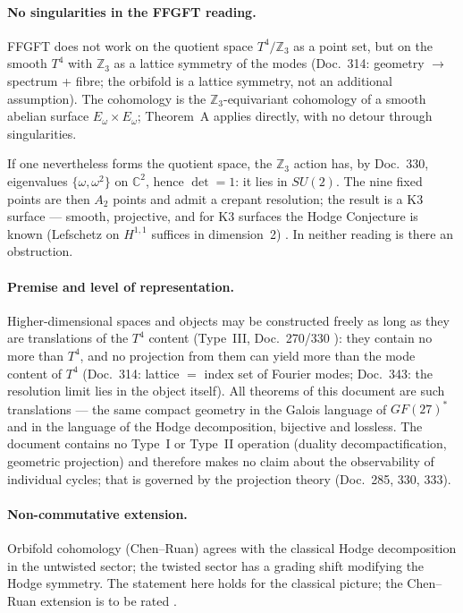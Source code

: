 \paragraph{No singularities in the FFGFT reading.}
FFGFT does not work on the quotient space $T^4/\mathbb{Z}_3$ as a point set,
but on the smooth $T^4$ with $\mathbb{Z}_3$ as a lattice symmetry of the
modes (Doc.~314: geometry $\to$ spectrum + fibre; the orbifold is a lattice
symmetry, not an additional assumption). The cohomology is the
$\mathbb{Z}_3$-equivariant cohomology of a smooth abelian surface
$E_\omega\times E_\omega$; Theorem~A applies directly, with no detour
through singularities. \BM

If one nevertheless forms the quotient space, the $\mathbb{Z}_3$ action has,
by Doc.~330, eigenvalues $\{\omega,\omega^2\}$ on $\mathbb{C}^2$, hence
$\det=1$: it lies in $SU(2)$. The nine fixed points are then $A_2$ points
and admit a crepant resolution; the result is a K3 surface --- smooth,
projective, and for K3 surfaces the Hodge Conjecture is known (Lefschetz on
$H^{1,1}$ suffices in dimension~2) \EM. In neither reading is there an
obstruction.

\paragraph{Premise and level of representation.}
Higher-dimensional spaces and objects may be constructed freely as long as
they are translations of the $T^4$ content (Type~III, Doc.~270/330 \KM):
they contain no more than $T^4$, and no projection from them can yield more
than the mode content of $T^4$ (Doc.~314: lattice $=$ index set of Fourier
modes; Doc.~343: the resolution limit lies in the object itself). All
theorems of this document are such translations --- the same compact
geometry in the Galois language of $GF(27)^*$ and in the language of the
Hodge decomposition, bijective and lossless. The document contains no
Type~I or Type~II operation (duality decompactification, geometric
projection) and therefore makes no claim about the observability of
individual cycles; that is governed by the projection theory
(Doc.~285, 330, 333).

\paragraph{Non-commutative extension.}
Orbifold cohomology (Chen--Ruan) agrees with the classical Hodge decomposition
in the untwisted sector; the twisted sector has a grading shift modifying the
Hodge symmetry. The statement here holds for the classical picture; the
Chen--Ruan extension is to be rated \SM.


